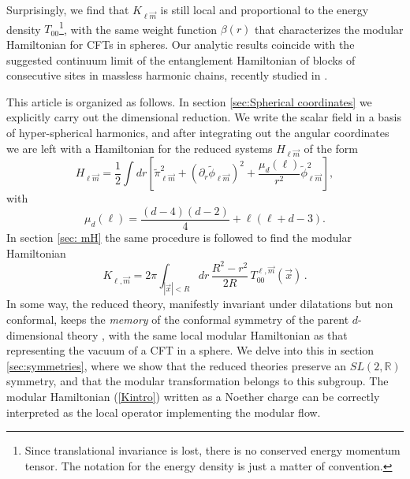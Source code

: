 \documentclass[12pt,a4paper]{article}
\newcommand{\be}{\begin{equation}}
\newcommand{\ee}{\end{equation}}
\def\be{\begin{equation}}
\def\ee{\end{equation}}
\begin{document}
Surprisingly, we find that $K_{\ell\vec{m}}$ is still local and proportional to the energy density $T_{00}$\footnote{Since translational invariance is lost, there is no conserved energy momentum tensor. The notation for the energy density is just a matter of convention.}, with the same weight function $\beta(r)$ that characterizes the modular Hamiltonian for CFTs in spheres.
Our analytic results coincide with the suggested continuum limit of the entanglement Hamiltonian of blocks of consecutive sites in massless harmonic chains, recently studied in \cite{Javerzat:2021hxt}.

This article is organized as follows. In section \ref{sec:Spherical coordinates} we explicitly carry out the dimensional reduction. We write the scalar field in a basis of hyper-spherical harmonics, and after integrating out the angular coordinates we are left with a Hamiltonian for the reduced systems $H_{\ell \vec{m}}$ of the form
\be
H_{\ell \vec{m}}=\frac{1}{2}\int  dr \left[\widetilde{\pi}_{\ell\vec{m}}^2 +(\partial_r \widetilde{\phi}_{\ell\vec{m}})^2+\frac{\mu_d(\ell)}{r^2} \widetilde{\phi}_{\ell\vec{m}} ^2 \right],
\label{h1d}
\ee
with
\be
\mu_d(\ell)=\frac{(d-4)(d-2)}{4}+\ell(\ell+d-3). 
\ee
In section \ref{sec: mH} the same procedure is followed to find the modular Hamiltonian
\be\label{Kintro}
K_{\ell, \vec{m}}=2\pi \int_{|\vec{x}|<R} dr\, \frac{R^2-r^2}{2R}\, T_{00}^{\ell, \vec{m}}(\vec{x})\,.
\ee 
In some way, the reduced theory, manifestly invariant under dilatations but non conformal, keeps the \textit{memory} of the conformal symmetry of the parent $d$-dimensional theory \cite{Jackiw:2011vz,Chamon:2011xk}, with the same local modular Hamiltonian as that representing the vacuum of a CFT in a sphere. We delve into this in section \ref{sec:symmetries}, where we show that the reduced theories preserve an $SL(2,\mathbb{R})$ symmetry, and that the modular transformation belongs to this subgroup.  The modular Hamiltonian (\ref{Kintro}) written as a Noether charge can be correctly interpreted as the local operator implementing the modular flow.
\end{document}

